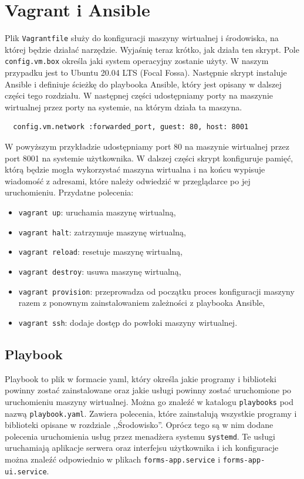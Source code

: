 \section{Vagrant i Ansible}
Plik \texttt{Vagrantfile} służy do konfiguracji maszyny wirtualnej i środowiska,
na której będzie działać narzędzie. Wyjaśnię teraz krótko, jak działa ten 
skrypt. Pole \texttt{config.vm.box} określa jaki system operacyjny zostanie
użyty. W naszym przypadku jest to Ubuntu 20.04 LTS (Focal Fossa). 
Następnie skrypt instaluje Ansible i definiuje ścieżkę do playbooka Ansible,
który jest opisany w dalszej części tego rozdziału. W następnej części
udostępniamy porty na maszynie wirtualnej przez porty na systemie, na którym
działa ta maszyna.
\begin{verbatim}
  config.vm.network :forwarded_port, guest: 80, host: 8001
\end{verbatim}
W powyższym przykładzie udostępniamy port 80 na maszynie wirtualnej
przez port 8001 na systemie użytkownika. W dalszej części skrypt konfiguruje pamięć, którą
będzie mogła wykorzystać maszyna wirtualna i na końcu wypisuje wiadomość z adresami,
które należy odwiedzić w przeglądarce po jej uruchomieniu. Przydatne polecenia:
\begin{itemize}
  \item \texttt{vagrant up}: uruchamia maszynę wirtualną,
  \item \texttt{vagrant halt}: zatrzymuje maszynę wirtualną,
  \item \texttt{vagrant reload}: resetuje maszynę wirtualną,
  \item \texttt{vagrant destroy}: usuwa maszynę wirtualną,
  \item \texttt{vagrant provision}: przeprowadza od początku proces konfiguracji
    maszyny razem z ponownym zainstalowaniem zależności z playbooka Ansible,
  \item \texttt{vagrant ssh}: dodaje dostęp do powłoki maszyny wirtualnej.
\end{itemize}

\subsection{Playbook}
Playbook to plik w formacie yaml, który określa jakie programy i biblioteki
powinny zostać zainstalowane oraz jakie usługi powinny zostać uruchomione po
uruchomieniu maszyny wirtualnej. Można go znaleźć w katalogu \texttt{playbooks}
pod nazwą \texttt{playbook.yaml}. Zawiera polecenia, które zainstalują wszystkie programy
i biblioteki opisane w rozdziale ,,Środowisko''. Oprócz tego są w nim dodane polecenia
uruchomienia usług przez menadżera systemu \texttt{systemd}. Te usługi uruchamiają
aplikacje serwera oraz interfejsu użytkownika i ich konfiguracje można znaleźć
odpowiednio w plikach \texttt{forms-app.service} i \texttt{forms-app-ui.service}.

